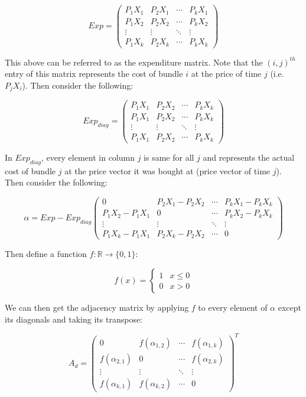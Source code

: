 \documentclass{article} %
\begin{document}
\[
Exp = 
 \begin{pmatrix}
  P_1X_1 & P_2X_1 & \cdots & P_kX_1 \\
  P_1X_2 & P_2X_2 & \cdots & P_kX_2 \\
  \vdots  & \vdots  & \ddots & \vdots  \\
  P_1X_k & P_2X_k & \cdots & P_kX_k
 \end{pmatrix}
\]

This above can be referred to as the expenditure matrix. Note that the $(i,j)^{th}$ entry of this matrix represents the cost of bundle $i$ at the price of time $j$ (i.e. $P_jX_i$). Then consider the following:

\[
Exp_{diag} = 
 \begin{pmatrix}
  P_1X_1 & P_2X_2 & \cdots & P_kX_k \\
  P_1X_1 & P_2X_2 & \cdots & P_kX_k \\
  \vdots  & \vdots  & \ddots & \vdots  \\
  P_1X_1 & P_2X_2 & \cdots & P_kX_k
 \end{pmatrix}
\]

In $Exp_{diag}$, every element in column $j$ is same for all $j$ and represents the actual cost of bundle $j$ at the price vector it was bought at (price vector of time $j$). Then consider the following:

\[
\alpha = Exp-Exp_{diag}
 \begin{pmatrix}
  0 & P_2X_1-P_2X_2 & \cdots & P_kX_1-P_kX_k \\
  P_1X_2-P_1X_1 & 0 & \cdots & P_kX_2-P_kX_k \\
  \vdots  & \vdots  & \ddots & \vdots  \\
  P_1X_k-P_1X_1 & P_2X_k-P_2X_2 & \cdots & 0
 \end{pmatrix}
\]

Then define a function $f:\mathbb{R}\to\{0,1\}$:

\[ 
f(x)=
    \begin{cases} 
      1 & x\leq0 \\
      0 & x>0
   \end{cases}
\]

We can then get the adjacency matrix by applying $f$ to every element of $\alpha$ except its diagonals and taking its transpose:

\[
A_d =
 \begin{pmatrix}
  0 & f(\alpha_{1,2}) & \cdots & f(\alpha_{1,k}) \\
  f(\alpha_{2,1}) & 0 & \cdots & f(\alpha_{2,k}) \\
  \vdots  & \vdots  & \ddots & \vdots  \\
  f(\alpha_{k,1}) & f(\alpha_{k,2}) & \cdots & 0
 \end{pmatrix} ^T
\]
\end{document}
